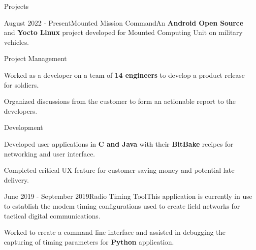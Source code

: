 \documentclass{article}
\newlength{\tabin}
\newlength{\secsep}
\newcommand{\lineunder}{\vspace*{-8pt} \\ \hspace*{-6pt} \hrulefill \\ \vspace*{-15pt}}
\newenvironment{tabbedsection}[1]{
	\begin{list}{}{
			\setlength{\itemsep}{0pt}
			\setlength{\labelsep}{0pt}
			\setlength{\labelwidth}{0pt}
			\setlength{\leftmargin}{0pt}
			\setlength{\rightmargin}{\tabin}
			\setlength{\listparindent}{0pt}
			\setlength{\parsep}{0pt}
			\setlength{\parskip}{0pt}
			\setlength{\partopsep}{0pt}
			\setlength{\topsep}{#1}
		}
		\item[]
	}{\end{list}}
\newenvironment{resume_section}[1]{
	\filbreak
	\vspace{2\secsep}
	\textsc{\color{blue}\large#1}
	\lineunder
	\begin{tabbedsection}{\secsep}
	}{\end{tabbedsection}}
\newenvironment{resume_project_subsection}[3]{
	\textbf{\color{BlueViolet}#2} \hfill \hspace{-5em} {\normalsize (#1)}
	\\ {\small \textit{ #3}}
	\begin{tabbedsection}{0.5\secsep}
		\begin{subitems}
		}{\end{subitems}\end{tabbedsection}}
\newenvironment{subitems}{
	\renewcommand{\labelitemi}{-}
	\begin{itemize}
		\setlength{\labelsep}{1em}
	}{\end{itemize}}
\newenvironment{resume_skill_group}[1]{
	\hspace{-18pt}\textbf{#1}
	\begin{itemize}
	}{\end{itemize}}
\begin{document}
\begin{resume_section}{Projects}
\begin{resume_project_subsection}{August 2022 - Present}{Mounted Mission Command}{An \textbf{Android Open Source} and \textbf{Yocto Linux} project developed for Mounted Computing Unit on military vehicles.}
\begin{resume_skill_group}{Project Management}
					\item 
					Worked as a developer on a team of \textbf{14 engineers} to develop a product release for soldiers. 
					\item 
						Organized discussions from the customer to form an actionable report to the developers.
	\iffalse
					\item 
						Formed most of the team’s documentation for testing, building, and development environments to support our team of developers that has doubled in size. 
					
\fi
			\end{resume_skill_group}

			\begin{resume_skill_group}{Development}
					\item 
					\item  
						Developed user applications in \textbf{C and Java} with their \textbf{BitBake} recipes for networking and user interface. 
					\item 
						Completed critical UX feature for customer saving money and potential late delivery.
			\end{resume_skill_group}
		\end{resume_project_subsection}
		\vspace{2\secsep}
		\begin{resume_project_subsection}{June 2019 - September 2019}{Radio Timing Tool}{This application is currently in use to establish the modem timing configurations used to create field networks for tactical digital communications.}
				\item 
					Worked to create a command line interface and assisted in debugging the capturing of timing parameters for \textbf{Python} application.
		\end{resume_project_subsection}
		\vspace{2\secsep}
		

\end{resume_section}
\end{document}
